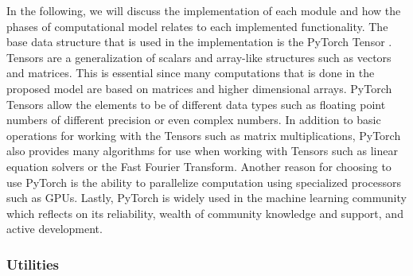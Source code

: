In the following, we will discuss the implementation of each module and how the phases of computational model relates to each implemented functionality. The base data structure that is used in the implementation is the PyTorch Tensor \autocite{Ansel_PyTorch_2_Faster_2024}. Tensors are a generalization of scalars and array-like structures such as vectors and matrices. This is essential since many computations that is done in the proposed model are based on matrices and higher dimensional arrays. PyTorch Tensors allow the elements to be of different data types such as floating point numbers of different precision or even complex numbers. In addition to basic operations for working with the Tensors such as matrix multiplications, PyTorch also provides many algorithms for use when working with Tensors such as linear equation solvers or the Fast Fourier Transform. Another reason for choosing to use PyTorch is the ability to parallelize computation using specialized processors such as GPUs. Lastly, PyTorch is widely used in the machine learning community which reflects on its reliability, wealth of community knowledge and support, and active development.

\subsubsection{Utilities}

